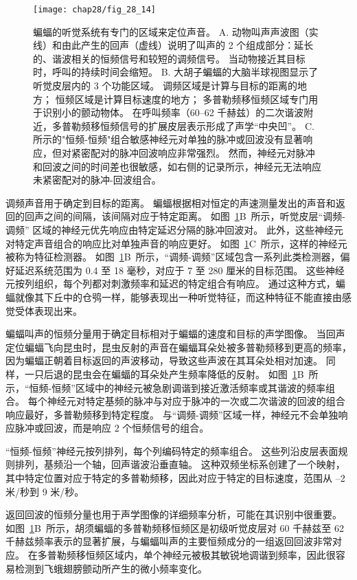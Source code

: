 \begin{figure}[htbp]
	\centering
	\texttt{[image: chap28/fig\_28\_14]}
	\caption{蝙蝠的听觉系统有专门的区域来定位声音。
		A. 动物叫声声波图（实线）和由此产生的回声（虚线）说明了叫声的 2 个组成部分：延长的、谐波相关的恒频信号和较短的调频信号。
		当动物接近其目标时，呼叫的持续时间会缩短\cite{suga1984neural}。
		B. 大胡子蝙蝠的大脑半球视图显示了听觉皮层内的 3 个功能区域。
		调频区域是计算与目标的距离的地方；
		恒频区域是计算目标速度的地方；
		多普勒频移恒频区域专门用于识别小的颤动物体。
		在呼叫频率（60–62 千赫兹）的二次谐波附近，多普勒频移恒频信号的扩展皮层表示形成了声学“中央凹”\cite{suga1984neural}。
		C. 所示的"恒频-恒频"组合敏感神经元对单独的脉冲或回波没有显著响应，但对紧密配对的脉冲回波响应非常强烈。
		然而，神经元对脉冲和回波之间的时间差也很敏感，如右侧的记录所示，神经元无法响应未紧密配对的脉冲-回波组合\cite{suga1983specificity}。}
	\label{fig:28_14}
\end{figure}


调频声音用于确定到目标的距离。
蝙蝠根据相对恒定的声速测量发出的声音和返回的回声之间的间隔，该间隔对应于特定距离。
如图~\ref{fig:28_14}B~所示，听觉皮层“调频-调频” 区域的神经元优先响应由特定延迟分隔的脉冲回波对。
此外，这些神经元对特定声音组合的响应比对单独声音的响应更好。
如图~\ref{fig:28_14}C~所示，这样的神经元被称为特征检测器。
如图~\ref{fig:28_14}B~所示，“调频-调频”区域包含一系列此类检测器，偏好延迟系统范围为 0.4 至 18 毫秒，对应于 7 至 280 厘米的目标范围。
这些神经元按列组织，每个列都对刺激频率和延迟的特定组合有响应。
通过这种方式，蝙蝠就像其下丘中的仓鸮一样，能够表现出一种听觉特征，而这种特征不能直接由感觉受体表现出来。


蝙蝠叫声的恒频分量用于确定目标相对于蝙蝠的速度和目标的声学图像。
当回声定位蝙蝠飞向昆虫时，昆虫反射的声音在蝙蝠耳朵处被多普勒频移到更高的频率，因为蝙蝠正朝着目标返回的声波移动，导致这些声波在其耳朵处相对加速。
同样，一只后退的昆虫会在蝙蝠的耳朵处产生频率降低的反射。
如图~\ref{fig:28_14}B~所示，“恒频-恒频”区域中的神经元被急剧调谐到接近激活频率或其谐波的频率组合。
每个神经元对特定基频的脉冲与对应于脉冲的一次或二次谐波的回波的组合响应最好，多普勒频移到特定程度。
与“调频-调频”区域一样，神经元不会单独响应脉冲或回波，而是响应 2 个恒频信号的组合。


“恒频-恒频”神经元按列排列，每个列编码特定的频率组合。
这些列沿皮层表面规则排列，基频沿一个轴，回声谐波沿垂直轴。
这种双频坐标系创建了一个映射，其中特定位置对应于特定的多普勒频移，因此对应于特定的目标速度，范围从 –2 米/秒到 9 米/秒。


返回回波的恒频分量也用于声学图像的详细频率分析，可能在其识别中很重要。
如图~\ref{fig:28_14}B~所示，胡须蝙蝠的多普勒频移恒频区是初级听觉皮层对 60 千赫兹至 62 千赫兹频率表示的显著扩展，与蝙蝠叫声的主要恒频成分的一组返回回波非常对应。
在多普勒频移恒频区域内，单个神经元被极其敏锐地调谐到频率，因此很容易检测到飞蛾翅膀颤动所产生的微小频率变化。



